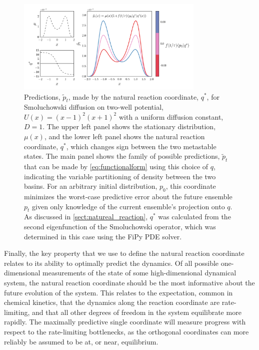 \documentclass[aip, jcp, reprint, nolinenumbers, twocolumn, nobalancelastpage, nofootinbib]{revtex4-1}
\begin{document}
\begin{figure}
\centering \includegraphics[width=0.8\textwidth]{doublewell-figure-crop.pdf}
    \caption{\label{fig:eq1} Predictions, $\tilde{p}_t$, made by the natural reaction coordinate, $q^*$, for Smoluchowski diffusion on two-well potential, $U(x) = (x-1)^2(x+1)^2$ with a uniform diffusion constant, $D=1$. The upper left panel shows the stationary distribution, $\mu(x)$, and the lower left panel shows the natural reaction coordinate, $q^*$, which changes sign between the two metastable states. The main panel shows the family of possible predictions, $\tilde{p}_t$ that can be made by \cref{eq:functionalform} using this choice of $q$, indicating the variable partitioning of density between the two basins. For an arbitrary initial distribution, $p_0$, this coordinate minimizes the worst-case predictive error about the future ensemble $p_t$ given only knowledge of the current ensemble's projection onto $q$. As discussed in \cref{sect:natureal_reaction}, $q^*$ was calculated from the second eigenfunction of the Smoluchowski operator, which was determined in this case using the FiPy PDE solver.\cite{FiPy:2009}}
\end{figure}

Finally, the key property that we use to define the natural reaction coordinate relates to its ability to optimally predict the dynamics. Of all possible one-dimensional measurements of the state of some high-dimensional dynamical system, the natural reaction coordinate should be the most informative about the future evolution of the system. This relates to the expectation, common in chemical kinetics, that the dynamics along the reaction coordinate are rate-limiting, and that all other degrees of freedom in the system equilibrate more rapidly. The maximally predictive single coordinate will measure progress with respect to the rate-limiting bottlenecks, as the orthogonal coordinates can more reliably be assumed to be at, or near, equilibrium.
\end{document}
